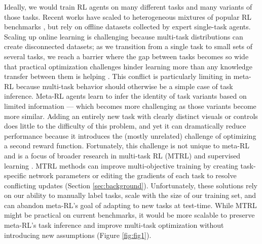 Ideally, we would train RL agents on many different tasks and many variants of those tasks. Recent works have scaled to heterogeneous mixtures of popular RL benchmarks \cite{reed2022a, hansen2023td, gallouedec2024jack}, but rely on offline datasets collected by expert single-task agents. Scaling up online learning is challenging because multi-task distributions can create disconnected datasets; as we transition from a single task to small sets of several tasks, we reach a barrier where the gap between tasks becomes so wide that practical optimization challenges hinder learning more than any knowledge transfer between them is helping \cite{taiga2023investigating, shaham2023causes, xin2022current}. This conflict is particularly limiting in meta-RL because multi-task behavior should otherwise be a simple case of task inference. Meta-RL agents learn to infer the identity of task variants based on limited information --- which becomes more challenging as those variants become more similar. Adding an entirely new task with clearly distinct visuals or controls does little to the difficulty of this problem, and yet it can dramatically reduce performance because it introduces the (mostly unrelated) challenge of optimizing a second reward function. Fortunately, this challenge is not unique to meta-RL and is a focus of broader research in multi-task RL (MTRL) and supervised learning \cite{zhang2021survey}. MTRL methods can improve multi-objective training by creating task-specific network parameters or editing the gradients of each task to resolve conflicting updates (Section \ref{sec:background}). Unfortunately, these solutions rely on our ability to manually label tasks, scale with the size of our training set, and can abandon meta-RL's goal of adapting to new tasks at test-time. While MTRL might be practical on current benchmarks, it would be more scalable to preserve meta-RL's task inference and improve multi-task optimization without introducing new assumptions (Figure \ref{fig:fig1}).



